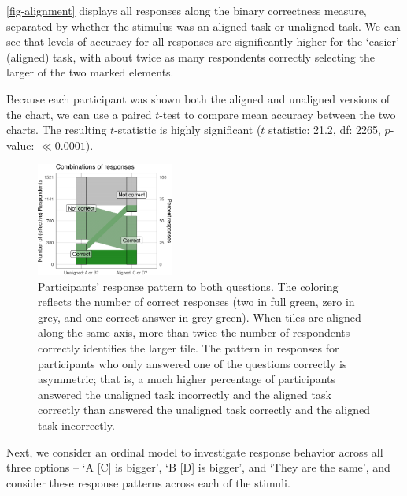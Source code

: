 \documentclass[
]{jds}
\begin{document}
\autoref{fig-alignment} displays all responses along the binary
correctness measure, separated by whether the stimulus was an aligned
task or unaligned task. We can see that levels of accuracy for all
responses are significantly higher for the `easier' (aligned) task, with
about twice as many respondents correctly selecting the larger of the
two marked elements.

Because each participant was shown both the aligned and unaligned
versions of the chart, we can use a paired \(t\)-test to compare mean
accuracy between the two charts. The resulting \(t\)-statistic is highly
significant (\(t\) statistic: 21.2, df: 2265, \(p\)-value:
\(\ll 0.0001\)).

\begin{figure}[hbt]

{\centering \includegraphics[width=0.4\textwidth,height=\textheight]{./figures/fig-alignment-1.png}

}

\caption{\label{fig-alignment}Participants' response pattern to both
questions. The coloring reflects the number of correct responses (two in
full green, zero in grey, and one correct answer in grey-green). When
tiles are aligned along the same axis, more than twice the number of
respondents correctly identifies the larger tile. The pattern in
responses for participants who only answered one of the questions
correctly is asymmetric; that is, a much higher percentage of
participants answered the unaligned task incorrectly and the aligned
task correctly than answered the unaligned task correctly and the
aligned task incorrectly.}

\end{figure}

Next, we consider an ordinal model to investigate response behavior
across all three options -- `A {[}C{]} is bigger', `B {[}D{]} is
bigger', and `They are the same', and consider these response patterns
across each of the stimuli.
\end{document}

